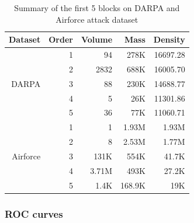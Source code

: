 \begin{table}[htbp]
\centering
\caption{Summary of the first 5 blocks on DARPA and Airforce attack dataset}
\label{table: k5_2}
\begin{tabular}{rrrrr}
\hline
Dataset                                                                                    & Order                  & Volume & Mass   & Density  \\ \hline
\multirow{5}{*}{DARPA}                                                                     & \multicolumn{1}{r|}{1} & 94     & 278K   & 16697.28 \\
                                                                                           & \multicolumn{1}{r|}{2} & 2832   & 688K   & 16005.70 \\
                                                                                           & \multicolumn{1}{r|}{3} & 88     & 230K   & 14688.77 \\
                                                                                           & \multicolumn{1}{r|}{4} & 5      & 26K    & 11301.86 \\
                                                                                           & \multicolumn{1}{r|}{5} & 36     & 77K    & 11060.71 \\ \hline
\multirow{5}{*}{Airforce}                                                                  & \multicolumn{1}{r|}{1} & 1      & 1.93M  & 1.93M    \\
                                                                                           & \multicolumn{1}{r|}{2} & 8      & 2.53M  & 1.77M    \\
                                                                                           & \multicolumn{1}{r|}{3} & 131K   & 554K   & 41.7K    \\
                                                                                           & \multicolumn{1}{r|}{4} & 3.71M  & 493K   & 27.2K    \\
                                                                                           & \multicolumn{1}{r|}{5} & 1.4K   & 168.9K & 19K      \\ \hline
\end{tabular}
\end{table}


\subsubsection{ROC curves}

